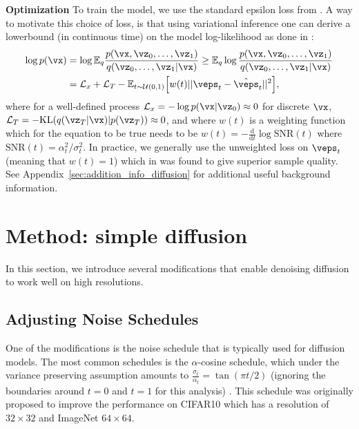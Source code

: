 \textbf{Optimization}
To train the model, we use the standard epsilon loss from \citep{ho2020denoising}. A way to motivate this choice of loss, is that using variational inference one can derive a lowerbound (in continuous time) on the model log-likelihood as done in \citep{kingma2021vdm}:
\small\begin{align*}
\begin{split}
   \log p(\vx) &= \log \mathbb{E}_{q} \frac{p(\vx, \vz_0, \ldots, \vz_1)}{q(\vz_0, \ldots, \vz_1 | \vx)} \geq \mathbb{E}_{q} \log \frac{p(\vx, \vz_0, \ldots, \vz_1)}{q(\vz_0, \ldots, \vz_1 | \vx)} \\
   &= \mathcal{L}_x + \mathcal{L}_T - \mathbb{E}_{t \sim \mathcal{U}(0, 1)} \Big{[} w(t) ||\veps_t - \hat{\veps}_t ||^2 \Big{]}, 
\end{split}
\end{align*}\normalsize
where for a well-defined process $\mathcal{L}_x = -\log p(\vx | \vz_0) \approx 0$ for discrete $\vx$, $\mathcal{L}_T = -\mathrm{KL}(q(\vz_T | \vx) | p(\vz_T)) \approx 0$, and where $w(t)$ is a weighting function which for the equation to be true needs to be $w(t) = - \frac{\mathrm{d}}{\mathrm{d}t}\log \mathrm{SNR}(t)$ where $\mathrm{SNR}(t) = \alpha_t^2 / \sigma_t^2$. In practice, we generally use the unweighted loss on $\veps_t$ (meaning that $w(t) = 1$) which in \citep{ho2020denoising} was found to give superior sample quality. See Appendix~\ref{sec:addition_info_diffusion} for additional useful background information.

\section{Method: simple diffusion}
In this section, we introduce several modifications that enable denoising diffusion to work well on high resolutions.

\subsection{Adjusting Noise Schedules}
One of the modifications is the noise schedule that is typically used for diffusion models. The most common schedules is the $\alpha$-cosine schedule, which under the variance preserving assumption amounts to $\frac{\sigma_t}{\alpha_t} = \tan(\pi t / 2)$ (ignoring the boundaries around $t=0$ and $t = 1$ for this analysis) \citep{nichol2021improvedddpm}. This schedule was originally proposed to improve the performance on CIFAR10 which has a resolution of $32 \times 32$ and ImageNet $64 \times 64$. 

